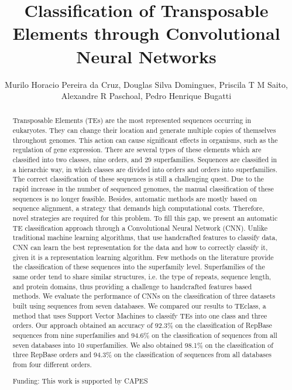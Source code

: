 \documentclass[twoside]{article}
\title{\vspace{-15mm}\fontsize{24pt}{10pt}\selectfont\textbf{ Classification of Transposable Elements through Convolutional Neural Networks }} %
\author{ Murilo Horacio Pereira da Cruz, Douglas Silva Domingues, Priscila T M Saito, Alexandre R Paschoal, Pedro Henrique Bugatti }
\affil{ S\~ao Paulo State University }
\date{}
\begin{document}
  
  
  \maketitle %
  
  
  \thispagestyle{fancy} %
  
  
  \begin{abstract}
  Transposable Elements (TEs) are the most represented sequences occurring in eukaryotes. They can change their location and generate multiple copies of themselves throughout genomes. This action can cause significant effects in organisms,  such as the regulation of gene expression. There are several types of these elements which are classified into two classes,  nine orders,  and 29 superfamilies. Sequences are classified in a hierarchic way,  in which classes are divided into orders and orders into superfamilies. The correct classification of these sequences is still a challenging quest. Due to the rapid increase in the number of sequenced genomes,  the manual classification of these sequences is no longer feasible. Besides,  automatic methods are mostly based on sequence alignment,  a strategy that demands high computational costs. Therefore,  novel strategies are required for this problem. To fill this gap,  we present an automatic TE classification approach through a Convolutional Neural Network (CNN). Unlike traditional machine learning algorithms,  that use handcrafted features to classify data,  CNN can learn the best representation for the data and how to correctly classify it,  given it is a representation learning algorithm. Few methods on the literature provide the classification of these sequences into the superfamily level. Superfamilies of the same order tend to share similar structures,  i.e. the type of repeats,  sequence length,  and protein domains,  thus providing a challenge to handcrafted features based methods. We evaluate the performance of CNNs on the classification of three datasets built using sequences from seven databases. We compared our results to TEclass,  a method that uses Support Vector Machines to classify TEs into one class and three orders. Our approach obtained an accuracy of 92.3\% on the classification of RepBase sequences from nine superfamilies and 94.6\% on the classification of sequences from all seven databases into 10 superfamilies. We also obtained 98.1\% on the classification of three RepBase orders and 94.3\% on the classification of sequences from all databases from four different orders.
  
  Funding: This work is supported by CAPES \\ 
  \end{abstract}
  
\end{document}
